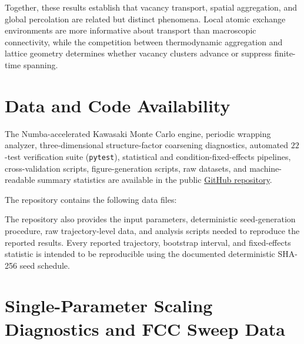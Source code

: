 \documentclass[aps,pre,reprint,superscriptaddress,amsmath,amssymb,floatfix]{revtex4-2}
\begin{document}
Together, these results establish that vacancy transport, spatial aggregation, and global percolation are related but distinct phenomena. Local atomic exchange environments are more informative about transport than macroscopic connectivity, while the competition between thermodynamic aggregation and lattice geometry determines whether vacancy clusters advance or suppress finite-time spanning.

\section*{Data and Code Availability}

The Numba-accelerated Kawasaki Monte Carlo engine, periodic wrapping analyzer, three-dimensional structure-factor coarsening diagnostics, automated $22$-test verification suite (\texttt{pytest}), statistical and condition-fixed-effects pipelines, cross-validation scripts, figure-generation scripts, raw datasets, and machine-readable summary statistics are available in the public
\href{https://github.com/salinode/lattice-vacancy-crossover}{GitHub repository}.

The repository contains the following data files:

\begingroup
\small
\ttfamily
\raggedright
\setlength{\parskip}{1.5pt}
\par
{}\par
{}\par
{}\par
{}\par
{}\par
{}\par
{}\par
{}\par
{}
\endgroup

The repository also provides the input parameters, deterministic seed-generation procedure, raw trajectory-level data, and analysis scripts needed to reproduce the reported results. Every reported trajectory, bootstrap interval, and fixed-effects statistic is intended to be reproducible using the documented deterministic SHA-256 seed schedule.

\appendix

\section{Single-Parameter Scaling Diagnostics and FCC Sweep Data}
\label{app:diagnostics}
\end{document}
